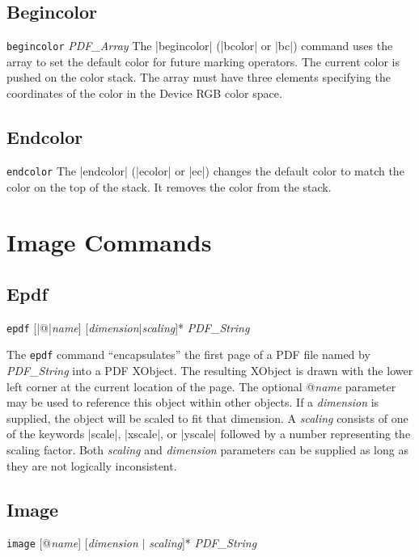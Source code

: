 {\subsection{Begincolor}
\syntax
{\tt begincolor} {\it PDF\_Array}
\description
The |begincolor| (|bcolor| or |bc|) command uses the
array to set the default color for future marking operators.
The current color is pushed on the color stack.  The
array must have three elements specifying the coordinates
of the color in the Device RGB color space.
\example
\begintt
{}
\endtt

\subsection{Endcolor}
\syntax
{\tt endcolor}
\description
The |endcolor| (|ecolor| or |ec|)
changes the default color to
match the color on the top
of the stack.  It removes
the color from the stack.
\example
\begintt
{}
\endtt


\section{Image Commands}
\subsection{Epdf}
\syntax
{\tt epdf} [|@|{\it name}] [{\it dimension}$\vert${\it scaling}]*  {\it PDF\_String}

\description
The {\tt epdf} command ``encapsulates'' the first page of a PDF
file named by {\it PDF\_String}
into a PDF XObject.  The resulting XObject is drawn
with the lower left corner at the current location of the page.
The optional @{\it name} parameter may be used
to reference this object within other objects.  If a
{\it dimension} is supplied, the object will be scaled to fit
that dimension.  A {\it scaling} consists of one of the keywords
|scale|, |xscale|, or |yscale| followed by a number representing
the scaling factor.  Both {\it scaling} and {\it dimension}
parameters can be supplied as long as they are not logically
inconsistent.
\example
\begintt
{}
\endtt

\subsection{Image}
\syntax
{\tt image} [@{\it name}] [{\it dimension} $\vert$ {\it scaling}]*  {\it PDF\_String}

}
